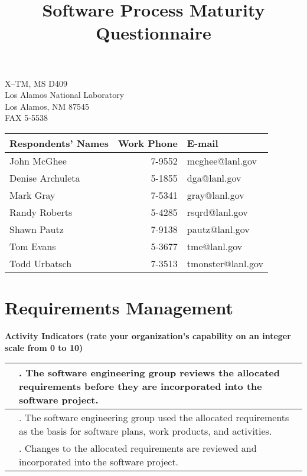 \documentclass{article}
\title{Software Process Maturity Questionnaire}
\newcommand{\KPAname}{}
\let\KPAsection=\section
\renewcommand{\section}[1]{\renewcommand{\KPAname}{#1}\KPAsection{#1}}
\newcounter{activity}[section]		%
\newcounter{approach}[section]
\newcounter{deployment}[section]
\newcounter{result}[section]
\newcounter{score}
\newenvironment{KPAActivity}
{
    {\bf Activity Indicators (rate your organization's capability
    on an integer scale from 0 to 10)} %
    \begin{center}
    \begin{tabular}{|p{0.5in}|p{6.0in}|} \hline %
}
{
    \end{tabular}
    \end{center}
    \setcounter{approach}{\value{approach}/\value{activity}}
    \setcounter{deployment}{\value{deployment}/\value{activity}}
    \setcounter{result}{\value{result}/\value{activity}}
}
\newcommand{\Activity}[4]
{
    \stepcounter{activity} 
    \setcounter{score}{(#1+#2+#3)/3}
    \setcounter{approach}{\value{approach}+#1}
    \setcounter{deployment}{\value{deployment}+#1}
    \setcounter{result}{\value{result}+#1}
    \arabic{score} & \arabic{activity}. #4 \\ \hline
} %
\begin{document}
\maketitle
\begin{center}
\parbox{35ex}{X--TM, MS D409\\
Los Alamos National Laboratory\\
Los Alamos, NM 87545\\
FAX 5-5538\\}

\begin{tabular}{|l|r|l|} \hline
{\bf Respondents' Names} & {\bf Work Phone} & {\bf E-mail} \\ \hline
John McGhee              & 7-9552           & mcghee@lanl.gov \\
Denise Archuleta         & 5-1855           & dga@lanl.gov \\
Mark Gray                & 7-5341           & gray@lanl.gov \\
Randy Roberts            & 5-4285           & rsqrd@lanl.gov \\
Shawn Pautz              & 7-9138           & pautz@lanl.gov \\
Tom Evans                & 5-3677           & tme@lanl.gov \\
Todd Urbatsch            & 7-3513           & tmonster@lanl.gov \\ \hline
\end{tabular}
\end{center}

\newpage
\section{Requirements Management}

\begin{KPAActivity}
\Activity{3}{3}{3}{The software engineering group reviews the allocated
requirements before they are incorporated into the software project.}
\Activity{3}{3}{3}{The software engineering group used the allocated
requirements as the basis for software plans, work products, and
activities.}
\Activity{3}{3}{3}{Changes to the allocated requirements are reviewed and
incorporated into the software project.}
\end{KPAActivity}
\end{document}
